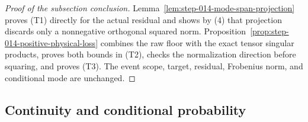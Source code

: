 \begin{proof}[Proof of the subsection conclusion]

Lemma~\ref{lem:step-014-mode-span-projection} proves (T1) directly for the
actual residual and shows by (4) that projection discards only a nonnegative
orthogonal squared norm. Proposition~\ref{prop:step-014-positive-physical-loss}
combines the raw floor with the exact tensor singular products,
proves both bounds in (T2), checks the normalization direction before
squaring, and proves (T3). The event scope, target, residual, Frobenius norm,
and conditional mode are unchanged.

\end{proof}

\subsection{Continuity and conditional probability}\label{app:step-015}

